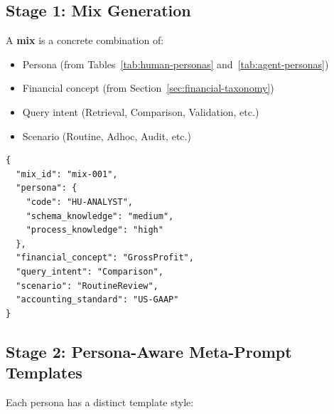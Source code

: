 \subsection{Stage 1: Mix Generation}

A \textbf{mix} is a concrete combination of:
\begin{itemize}
  \item Persona (from Tables~\ref{tab:human-personas} and~\ref{tab:agent-personas})
  \item Financial concept (from Section~\ref{sec:financial-taxonomy})
  \item Query intent (Retrieval, Comparison, Validation, etc.)
  \item Scenario (Routine, Adhoc, Audit, etc.)
\end{itemize}

\begin{lstlisting}[language=jsonx,caption={Example mix}]
{
  "mix_id": "mix-001",
  "persona": {
    "code": "HU-ANALYST",
    "schema_knowledge": "medium",
    "process_knowledge": "high"
  },
  "financial_concept": "GrossProfit",
  "query_intent": "Comparison",
  "scenario": "RoutineReview",
  "accounting_standard": "US-GAAP"
}
\end{lstlisting}

\subsection{Stage 2: Persona-Aware Meta-Prompt Templates}

Each persona has a distinct template style:


